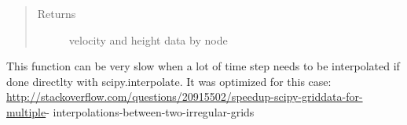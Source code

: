 \documentclass[letterpaper,10pt,english]{sphinxmanual}
\begin{document}
\begin{fulllineitems}
\begin{quote}
\begin{description}
\item[{Returns}] \leavevmode
velocity and height data by node

\end{description}\end{quote}


This function can be very slow when a lot of time step needs to be interpolated if done directlty with
scipy.interpolate. It was optimized for this case:
\url{http://stackoverflow.com/questions/20915502/speedup-scipy-griddata-for-multiple}-
interpolations-between-two-irregular-grids

\end{fulllineitems}

\end{document}
